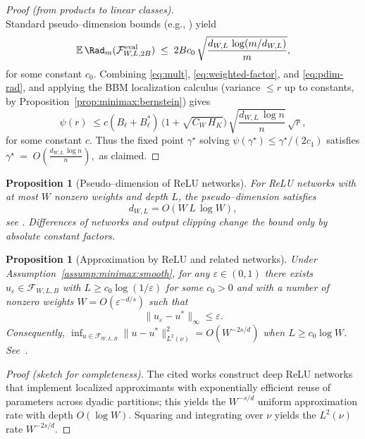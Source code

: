 \documentclass[pdflatex,sn-mathphys-ay]{sn-jnl}%
\numberwithin{equation}{section}
\theoremstyle{thmstyleone}%
\newtheorem{proposition}[theorem]{Proposition}%
\theoremstyle{thmstyletwo}%
\theoremstyle{thmstylethree}%
\begin{document}
\begin{proof}[Proof (from products to linear classes)]
\begin{equation}
\end{equation}
Standard pseudo--dimension bounds (e.g., \cite[Sec.~3]{bartlett2019nearly}) yield
\begin{equation}\label{eq:pdim-rad}
\mathbb{E}\,\Rad_{m}(\mathcal{F}_{W,L,2B}^{\mathrm{eval}}) \;\leq\; 2Bc_0\,\sqrt{\frac{d_{W,L}\,\log(m/d_{W,L})}{m}},
\end{equation}
for some constant $c_0$. Combining \eqref{eq:mult}, \eqref{eq:weighted-factor}, and \eqref{eq:pdim-rad}, and applying the BBM localization calculus (variance \(\leq r\) up to constants, by Proposition~\ref{prop:minimax:bernstein}) gives
\[
\psi(r)\;\leq c(B_\ell+B_\ell^{\!*})\,\big(1+\sqrt{C_W\,H_K}\big)\,\sqrt{\frac{d_{W,L}\,\log n}{n}}\,\sqrt{r},
\]
for some constant $c$. Thus the fixed point \(\gamma^\star\) solving \(\psi(\gamma^\star)\le \gamma^\star/(2c_1)\) satisfies
\(
\gamma^\star \ = \; O(\frac{d_{W,L}\,\log n}{n}),
\)
as claimed.
\end{proof}

\begin{proposition}[Pseudo–dimension of ReLU networks]\label{prop:minimax:pdim}
For ReLU networks with at most \(W\) nonzero weights and depth \(L\), the pseudo–dimension satisfies
\begin{equation}\label{eq:minimax:pdim}
d_{W,L} = O(W\,L\,\log W),
\end{equation}
see \cite{bartlett2019nearly,Langer2021}.  Differences of networks and output clipping change the bound only by absolute constant factors.
\end{proposition}

\begin{proposition}[Approximation by ReLU and related networks]\label{prop:minimax:approx}
Under Assumption~\ref{assump:minimax:smooth}, for any \(\varepsilon\in(0,1)\) there exists \(u_\varepsilon\in\mathcal{F}_{W,L,B}\) with \(L\geq c_0\log(1/\varepsilon)\) for some $c_0>0$ and with a number of nonzero weights \(W = O(\varepsilon^{-d/s})\) such that
\begin{equation}\label{eq:minimax:approx}
\|u_\varepsilon-u^*\|_\infty\le \varepsilon.
\end{equation}
Consequently, \(\inf_{u\in\mathcal{F}_{W,L,B}}\|u-u^*\|_{L^2(\nu)}^2 = O(W^{-2s/d})\) when \(L \geq c_0\log W\).  See~\cite{yarotsky2017error,yarotsky2018optimal,suzuki2018adaptivity,siegel2023optimal,Mhaskar1996}.
\end{proposition}

\begin{proof}[Proof (sketch for completeness)]
The cited works construct deep ReLU networks that implement localized approximants with exponentially efficient reuse of parameters across dyadic partitions; this yields the \(W^{-s/d}\) uniform approximation rate with depth \(O(\log W)\).  Squaring and integrating over \(\nu\) yields the \(L^2(\nu)\) rate \(W^{-2s/d}\).
\end{proof}
\end{document}
